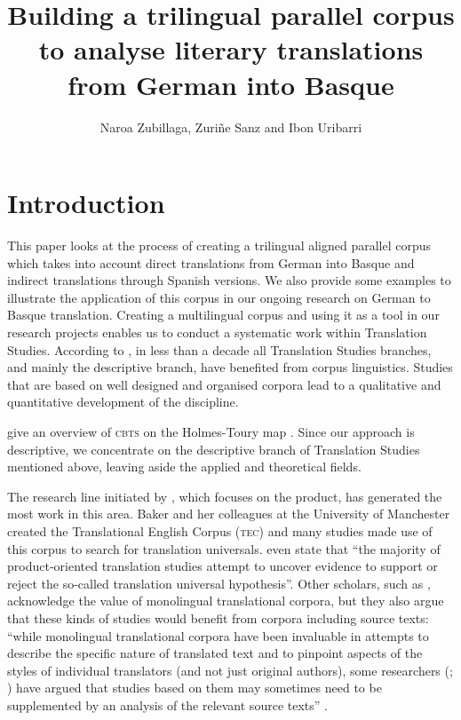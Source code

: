 \documentclass[output=paper]{LSP/langsci}
\author{Naroa Zubillaga, Zuriñe Sanz and Ibon Uribarri}
\title{Building a trilingual parallel corpus to analyse literary translations from {German into Basque}}
\begin{document}
\section{Introduction} \label{sec:3:1}
  
This paper looks at the process of creating a trilingual aligned parallel corpus which takes into account direct translations from German into Basque and indirect translations through Spanish versions. We also provide some examples to illustrate the application of this corpus in our ongoing research on German to Basque translation. Creating a multilingual corpus and using it as a tool in our research projects enables us to conduct a systematic work within Translation Studies. According to \citet[216]{Corpas2008}, in less than a decade all Translation Studies branches, and mainly the descriptive branch, have benefited from corpus linguistics. Studies that are based on well designed and organised corpora lead to a qualitative and quantitative development of the discipline.

\citet{Xiao2009} give an overview of \textsc{cbts} on the Holmes-Toury map \citep[243]{Xiao2009}. Since our approach is descriptive, we concentrate on the descriptive branch of Translation Studies mentioned above, leaving aside the applied and theoretical fields.

The research line initiated by \citet{Baker1993}, which focuses on the product, has generated the most work in this area. Baker and her colleagues at the University of Manchester created the Translational English Corpus (\textsc{tec}) and many studies \citep[e.g.][]{Lavios1998b,Olohan2000,Olohan2003} made use of this corpus to search for translation universals. \citet[244]{Xiao2009} even state that “the majority of product-oriented translation studies attempt to uncover evidence to support or reject the so-called translation universal hypothesis”. Other scholars, such as \citet{Kenny2001}, acknowledge the value of monolingual translational corpora, but they also argue that these kinds of studies would benefit from corpora including source texts: “while monolingual translational corpora have been invaluable in attempts to describe the specific nature of translated text and to pinpoint aspects of the styles of individual translators (and not just original authors), some researchers (\citealt[565]{Lavios1998b}; \citealt[565]{Puurtinen1998}) have argued that studies based on them may sometimes need to be supplemented by an analysis of the relevant source texts” \citep[62]{Kenny2001}.
\end{document}

